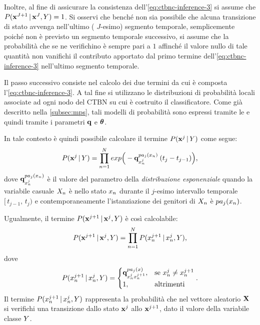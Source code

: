 Inoltre, al fine di assicurare la consistenza dell'\autoref{eq:ctbnc-inference-3} si assume che $P(\mathbf{x}^{J+1}\,\arrowvert\,\mathbf{x}^J,\mathnormal{Y})=1$. Si osservi che benché non sia possibile che alcuna transizione di stato avvenga nell'ultimo (\ie{} $J$-esimo) segmento temporale, semplicemente poiché non è previsto un segmento temporale successivo, si assume che la probabilità che se ne verifichino è sempre pari a $1$ affinché il valore nullo di tale quantità non vanifichi il contributo apportato dal primo termine dell'\autoref{eq:ctbnc-inference-3} nell'ultimo segmento temporale.

Il passo successivo consiste nel calcolo dei due termini da cui è composta l'\autoref{eq:ctbnc-inference-3}. A tal fine si utilizzano le distribuzioni di probabilità locali associate ad ogni nodo del \acs{CTBN} su cui è costruito il classificatore. Come già descritto nella \autoref{subsec:mps}, tali modelli di probabilità sono espressi tramite le \cim{} e quindi tramite i parametri $\boldsymbol{\textbf{\text{q}}}$ e $\boldsymbol{\textbf{\text{$\theta$}}}$.

In tale contesto è quindi possibile calcolare il termine $P(\mathbf{x}^j\,\arrowvert\,\mathnormal{Y})$ come segue:
\begin{equation}\label{eq:ctbnc-inference-4}
P(\mathbf{x}^j\,\arrowvert\,\mathnormal{Y})=\prod_{n=1}^N exp\Big(-\boldsymbol{\textbf{\text{q}}}_{\mathnormal{x}_n^j}^{pa_j(\mathnormal{x}_n)}\:(t_j - t_{j-1})\Big)\text{,}
\end{equation}
dove $\boldsymbol{\textbf{\text{q}}}_{\mathnormal{x}_n^j}^{pa_j(\mathnormal{x}_n)}$ è il valore del parametro della \emph{distribuzione esponenziale} quando la variabile casuale $\mathnormal{X}_n$ è nello stato $\mathnormal{x}_n$ durante il $j$-esimo intervallo temporale $[\,t_{j-1},\,t_j)$ e contemporaneamente l'istanziazione dei genitori di $\mathnormal{X}_n$ è $pa_j(\mathnormal{x}_n)$.

Ugualmente, il termine $P(\mathbf{x}^{j+1}\,\arrowvert\,\mathbf{x}^j,\mathnormal{Y})$ è così calcolabile:
\begin{equation}\label{eq:ctbnc-inference-5}
P(\mathbf{x}^{j+1}\,\arrowvert\,\mathbf{x}^j,\mathnormal{Y})=\prod_{n=1}^N P(\mathnormal{x}_n^{j+1}\,\arrowvert\,\mathnormal{x}_n^j,\mathnormal{Y})\text{,}
\end{equation}
dove
\begin{equation}\label{eq:ctbnc-inference-6}
P(\mathnormal{x}_n^{j+1}\,\arrowvert\,\mathnormal{x}_n^j,\mathnormal{Y})=
\begin{cases}
\boldsymbol{\textbf{\text{q}}}_{\mathnormal{x}_n^j\mathnormal{x}_n^{j+1}}^{pa_j(\mathnormal{x})}, & \text{se } \mathnormal{x}_n^j \neq \mathnormal{x}_n^{j+1} \\
1, & \text{altrimenti}
\end{cases}\text{.}
\end{equation}
Il termine $P(\mathnormal{x}_n^{j+1}\,\arrowvert\,\mathnormal{x}_n^j,\mathnormal{Y})$ rappresenta la probabilità che nel vettore aleatorio $\mathbf{X}$ si verifichi una transizione dallo stato $\mathbf{x}^j$ allo $\mathbf{x}^{j+1}$, dato il valore della variabile classe $\mathnormal{Y}$.

